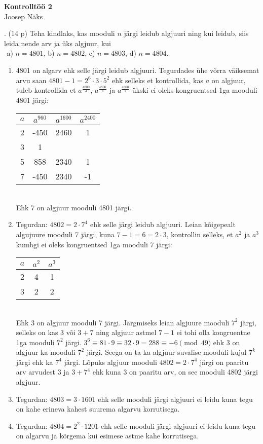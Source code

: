 \documentclass[a4paper, 10pt]{article}
\begin{document}
\begin{center}
\Large\textbf{Kontrolltöö 2}\\
\small{Joosep Näks}
\end{center}

. (14 p) Teha kindlaks, kas mooduli $n$ j\"argi leidub algjuuri ning 
kui leidub, siis leida nende arv ja \"uks algjuur, kui \\
{${}_{}$}\hskip1.5cm
 a) $n=4801$, \hskip0.5cm b) $n=4802$, \hskip0.5cm c) $n=4803$, \hskip0.5cm d) $n=4804$.

\bigskip
\begin{enumerate}[label=\alph*)]
\item 4801 on algarv ehk selle järgi leidub algjuuri. Tegurdades ühe võrra väiksemat arvu saan $4801-1=2^6\cdot3\cdot5^2$ ehk selleks et kontrollida, kas $a$ on algjuur, tuleb kontrollida et $a^{\frac{4800}{2}}$, $a^{\frac{4800}{3}}$ ja $a^{\frac{4800}{5}}$ ükski ei oleks kongruentsed 1ga mooduli 4801 järgi:\\
\begin{tabular}{c|ccc}
$a$&$a^{960}$&$a^{1600}$&$a^{2400}$\\
\hline
2&-450&2460&1\\
3&1\\
5&858&2340&1\\
7&-450&2340&-1
\end{tabular}\\
Ehk 7 on algjuur mooduli 4801 järgi.
\item Tegurdan: $4802=2\cdot7^4$ ehk selle järgi leidub algjuuri. Leian kõigepealt algujuure mooduli 7 järgi, kuna $7-1=6=2\cdot3$, kontrollin selleks, et $a^2$ ja $a^3$ kumbgi ei oleks kongruentsed 1ga mooduli 7 järgi:\\
\begin{tabular}{c|cc}
$a$&$a^2$&$a^3$\\
\hline
2&4&1\\
3&2&2
\end{tabular}\\
Ehk 3 on algjuur mooduli 7 järgi. Järgmiseks leian algjuure mooduli $7^2$ järgi, selleks on kas 3 või $3+7$ ning algjuur astmel $7-1$ ei tohi olla kongruentne 1ga mooduli $7^2$ järgi. \mbox{$3^6\equiv81\cdot9\equiv32\cdot9=288\equiv-6\pmod {49}$} ehk 3 on algjuur ka mooduli $7^2$ järgi. Seega on ta ka algjuur suvalise mooduli kujul $7^k$ järgi ehk ka $7^4$ järgi. Lõpuks algjuur mooduli $4802=2\cdot7^4$ järgi on paaritu arv arvudest 3 ja $3+7^4$ ehk kuna 3 on paaritu arv, on see mooduli 4802 järgi algjuur.
\item Tegurdan: $4803=3\cdot1601$ ehk selle mooduli järgi algjuuri ei leidu kuna tegu on kahe erineva kahest suurema algarvu korrutisega.
\item Tegurdan: $4804=2^2\cdot1201$ ehk selle mooduli järgi algjuuri ei leidu kuna tegu on algarvu ja kõrgema kui esimese astme kahe korrutisega.
\end{enumerate}
\bigskip
\end{document}
